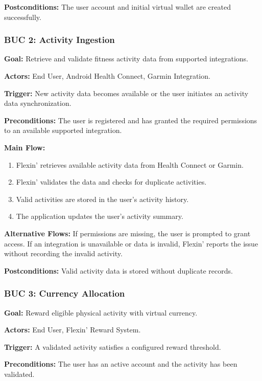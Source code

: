 \documentclass[12pt]{article}
\begin{document}
\textbf{Postconditions:} The user account and initial virtual wallet are
created successfully.

\subsubsection*{BUC 2: Activity Ingestion}

\textbf{Goal:} Retrieve and validate fitness activity data from supported
integrations.

\textbf{Actors:} End User, Android Health Connect, Garmin Integration.

\textbf{Trigger:} New activity data becomes available or the user initiates
an activity data synchronization.

\textbf{Preconditions:} The user is registered and has granted the required
permissions to an available supported integration.

\textbf{Main Flow:}
\begin{enumerate}
    \item Flexin' retrieves available activity data from Health Connect or Garmin.
    \item Flexin' validates the data and checks for duplicate activities.
    \item Valid activities are stored in the user's activity history.
    \item The application updates the user's activity summary.
\end{enumerate}

\textbf{Alternative Flows:} If permissions are missing, the user is prompted
to grant access. If an integration is unavailable or data is invalid,
Flexin' reports the issue without recording the invalid activity.

\textbf{Postconditions:} Valid activity data is stored without duplicate
records.

\subsubsection*{BUC 3: Currency Allocation}

\textbf{Goal:} Reward eligible physical activity with virtual currency.

\textbf{Actors:} End User, Flexin' Reward System.

\textbf{Trigger:} A validated activity satisfies a configured reward threshold.

\textbf{Preconditions:} The user has an active account and the activity has
been validated.
\end{document}
